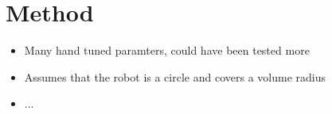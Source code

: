 


\section{Method}
\label{sec:discussion-method}

\begin{itemize}
    \item Many hand tuned paramters, could have been tested more
    \item Assumes that the robot is a circle and covers a volume radius
    \item ...
\end{itemize}




